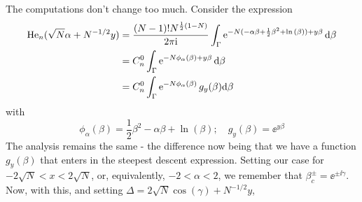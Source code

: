
The computations don't change too much. Consider the expression
\begin{align}
	\mathrm{He}_n(\sqrt{N}\alpha + N^{-1/2} y) & =  \frac{(N-1)! N^{\frac{1}{2}\left(1-N\right)}}{2\pi \mathrm{i}} \int_{\Gamma}  \operatorname{e}^{-N(- \alpha \beta+ \frac{1}{2} \beta^2 + \ln{(\beta)}) + y \beta} \mathrm{d} \beta \\
	& = C_n^0 \int_{\Gamma}  \operatorname{e}^{-N \phi_\alpha(\beta) + y \beta} \mathrm{d} \beta \\
	& = C_n^0 \int_{\Gamma}  \operatorname{e}^{-N \phi_\alpha(\beta)} g_y(\beta) \mathrm{d} \beta
	\label{Equation: Hermite Integral}
\end{align}
with 
\begin{equation}
	\phi_\alpha(\beta) = \frac{1}{2} \beta^2 - \alpha \beta + \ln{(\beta)}; \quad g_y(\beta) = \ee^{y \beta}
\end{equation}
The analysis remains the same - the difference now being that we have a function $g_y(\beta)$ that enters in the steepest descent expression. Setting our case for $-2\sqrt{N} < x < 2\sqrt{N}$, or, equivalently, $-2 < \alpha < 2$, we remember that $\beta_c^\pm = \ee^{\pm \ii \gamma}$. Now, with this, and setting $\Delta = 2\sqrt{N}\cos(\gamma) + N^{-1/2} y$,
